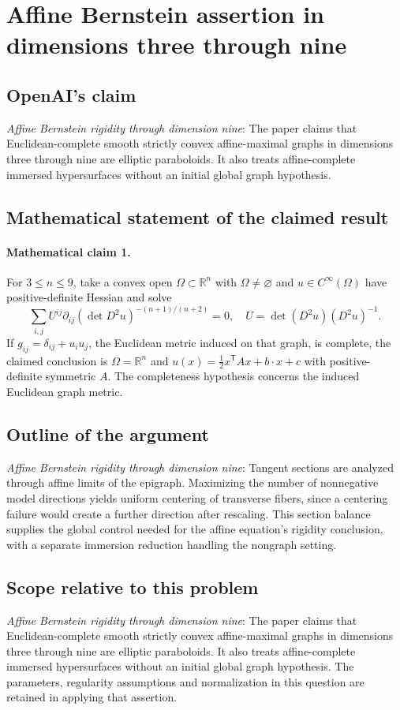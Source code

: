 \documentclass[11pt]{article}
\begin{document}
\section*{Affine Bernstein assertion in dimensions three through nine}

\subsection{OpenAI's claim}
\textit{Affine Bernstein rigidity through dimension nine}: The paper claims that Euclidean-complete smooth strictly convex affine-maximal graphs in dimensions three through nine are elliptic paraboloids. It also treats affine-complete immersed hypersurfaces without an initial global graph hypothesis.

\subsection{Mathematical statement of the claimed result}
\paragraph{Mathematical claim 1.} For $3\le n\le9$, take a convex open $\Omega\subset\mathbb R^n$ with $\Omega\ne\varnothing$ and $u\in C^\infty(\Omega)$ have positive-definite Hessian and solve \[\sum_{i,j}U^{ij}\partial_{ij}(\det D^2u)^{-(n+1)/(n+2)}=0,\quad U=\det(D^2u)(D^2u)^{-1}.\] If $g_{ij}=\delta_{ij}+u_iu_j$, the Euclidean metric induced on that graph, is complete, the claimed conclusion is $\Omega=\mathbb R^n$ and $u(x)=\tfrac12x^{\mathsf T}Ax+b\cdot x+c$ with positive-definite symmetric $A$. The completeness hypothesis concerns the induced Euclidean graph metric.

\subsection{Outline of the argument}
\textit{Affine Bernstein rigidity through dimension nine}: Tangent sections are analyzed through affine limits of the epigraph. Maximizing the number of nonnegative model directions yields uniform centering of transverse fibers, since a centering failure would create a further direction after rescaling. This section balance supplies the global control needed for the affine equation’s rigidity conclusion, with a separate immersion reduction handling the nongraph setting.

\subsection{Scope relative to this problem}
\textit{Affine Bernstein rigidity through dimension nine}: The paper claims that Euclidean-complete smooth strictly convex affine-maximal graphs in dimensions three through nine are elliptic paraboloids. It also treats affine-complete immersed hypersurfaces without an initial global graph hypothesis. The parameters, regularity assumptions and normalization in this question are retained in applying that assertion.
\end{document}
